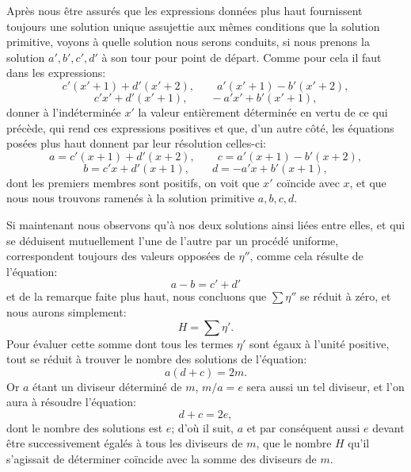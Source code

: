 \documentclass[11pt]{article}
\begin{document}
Après nous être assurés que les expressions données plus haut fournissent toujours une solution unique assujettie aux mêmes conditions que la solution primitive, voyons à quelle solution nous serons conduits, si nous prenons la solution \(a',b',c',d'\) à son tour pour point de départ. Comme pour cela il faut dans les expressions:
\[
c'(x'+1)+d'(x'+2),\qquad a'(x'+1)-b'(x'+2),
\]
\[
c'x'+d'(x'+1),\qquad -a'x'+b'(x'+1),
\]
donner à l'indéterminée \(x'\) la valeur entièrement déterminée en vertu de ce qui précède, qui rend ces expressions positives et que, d'un autre côté, les équations posées plus haut donnent par leur résolution celles-ci:
\[
a=c'(x+1)+d'(x+2),\qquad c=a'(x+1)-b'(x+2),
\]
\[
b=c'x+d'(x+1),\qquad d=-a'x+b'(x+1),
\]
dont les premiers membres sont positifs, on voit que \(x'\) coïncide avec \(x\), et que nous nous trouvons ramenés à la solution primitive \(a,b,c,d\).

Si maintenant nous observons qu'à nos deux solutions ainsi liées entre elles, et qui se déduisent mutuellement l'une de l'autre par un procédé uniforme, correspondent toujours des valeurs opposées de \(\eta''\), comme cela résulte de l'équation:
\[
a-b=c'+d'
\]
et de la remarque faite plus haut, nous concluons que \(\sum\eta''\) se réduit à zéro, et nous aurons simplement:
\[
H=\sum\eta'.
\]
Pour évaluer cette somme dont tous les termes \(\eta'\) sont égaux à l'unité positive, tout se réduit à trouver le nombre des solutions de l'équation:
\[
a(d+c)=2m.
\]
Or \(a\) étant un diviseur déterminé de \(m\), \(m/a=e\) sera aussi un tel diviseur, et l'on aura à résoudre l'équation:
\[
d+c=2e,
\]
dont le nombre des solutions est \(e\); d'où il suit, \(a\) et par conséquent aussi \(e\) devant être successivement égalés à tous les diviseurs de \(m\), que le nombre \(H\) qu'il s'agissait de déterminer coïncide avec la somme des diviseurs de \(m\).
\end{document}
